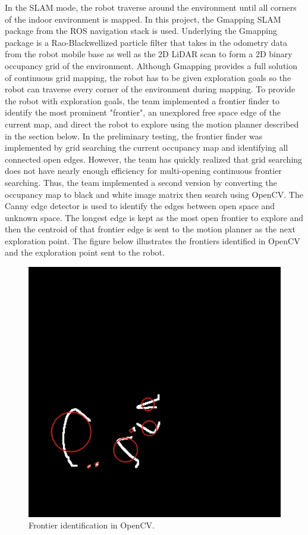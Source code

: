 \documentclass[11pt]{article}
\begin{document}
In the SLAM mode, the robot traverse around the environment until all corners of the indoor environment is mapped. In this project, the Gmapping SLAM package from the ROS navigation stack is used. Underlying the Gmapping package is a Rao-Blackwellized particle filter that takes in the odometry data from the robot mobile base as well as the 2D LiDAR scan to form a 2D binary occupancy grid of the environment. Although Gmapping provides a full solution of continuous grid mapping, the robot has to be given exploration goals so the robot can traverse every corner of the environment during mapping. To provide the robot with exploration goals, the team implemented a frontier finder to identify the most prominent "frontier", an unexplored free space edge of the current map, and direct the robot to explore using the motion planner described in the section below. In the preliminary testing, the frontier finder was implemented by grid searching the current occupancy map and identifying all connected open edges. However, the team has quickly realized that grid searching does not have nearly enough efficiency for multi-opening continuous frontier searching. Thus, the team implemented a second version by converting the occupancy map to black and white image matrix then search using OpenCV. The Canny edge detector is used to identify the edges between open space and unknown space. The longest edge is kept as the most open frontier to explore and then the centroid of that frontier edge is sent to the motion planner as the next exploration point. The figure below illustrates the frontiers identified in OpenCV and the exploration point sent to the robot.

\begin{figure}[H]
    \centering
        \includegraphics[scale=.4, angle =0]{figures/SLAM-1.png}
    \caption{Frontier identification in OpenCV.}
    \label{Frontier identification in OpenCV}
\end{figure}
\end{document}
